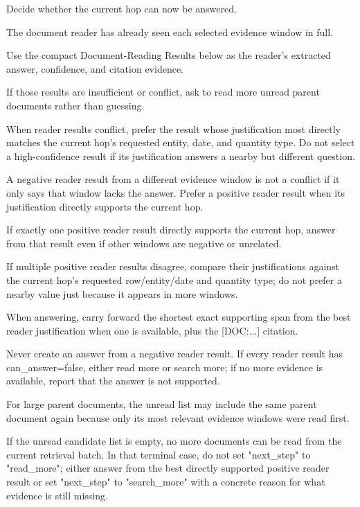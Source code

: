 \begin{tcolorbox}[colback=white, colframe=my-green, coltitle=black, parskip=5mm, title=\textbf{Hop Resolve}, halign=flush left, enhanced, breakable, skin first=enhanced, skin middle=enhanced, skin last=enhanced]
\begin{scriptsize}
\ttfamily
\setlength{\parindent}{0pt}
Decide whether the current hop can now be answered.\par
\mbox{}\par
The document reader has already seen each selected evidence window in full.\par
Use the compact Document-Reading Results below as the reader's extracted answer, confidence, and citation evidence.\par
If those results are insufficient or conflict, ask to read more unread parent documents rather than guessing.\par
When reader results conflict, prefer the result whose justification most directly matches the current hop's requested entity, date, and quantity type. Do not select a high-confidence result if its justification answers a nearby but different question.\par
A negative reader result from a different evidence window is not a conflict if it only says that window lacks the answer. Prefer a positive reader result when its justification directly supports the current hop.\par
If exactly one positive reader result directly supports the current hop, answer from that result even if other windows are negative or unrelated.\par
If multiple positive reader results disagree, compare their justifications against the current hop's requested row/entity/date and quantity type; do not prefer a nearby value just because it appears in more windows.\par
When answering, carry forward the shortest exact supporting span from the best reader justification when one is available, plus the [DOC:...] citation.\par
Never create an answer from a negative reader result. If every reader result has can\_answer=false, either read more or search more; if no more evidence is available, report that the answer is not supported.\par
For large parent documents, the unread list may include the same parent document again because only its most relevant evidence windows were read first.\par
If the unread candidate list is empty, no more documents can be read from the current retrieval batch. In that terminal case, do not set "next\_step" to "read\_more"; either answer from the best directly supported positive reader result or set "next\_step" to "search\_more" with a concrete reason for what evidence is still missing.\par

\end{scriptsize}
\end{tcolorbox}

